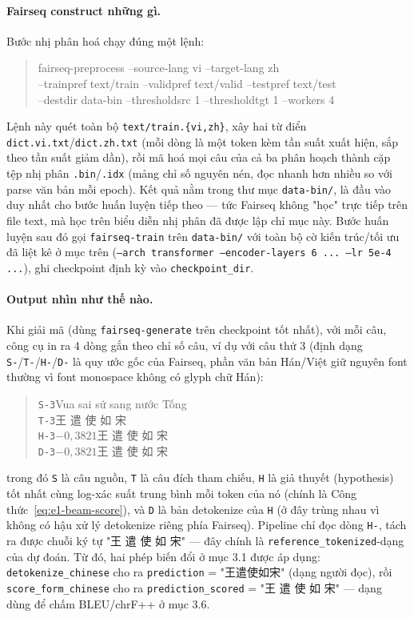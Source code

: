 \paragraph{Fairseq construct những gì.} Bước nhị phân hoá chạy đúng một lệnh:
\begin{quote}\ttfamily\small
fairseq-preprocess --source-lang vi --target-lang zh \\
\quad --trainpref text/train --validpref text/valid --testpref text/test \\
\quad --destdir data-bin --thresholdsrc 1 --thresholdtgt 1 --workers 4
\end{quote}
Lệnh này quét toàn bộ \texttt{text/train.\{vi,zh\}}, xây hai từ điển
\texttt{dict.vi.txt}/\texttt{dict.zh.txt} (mỗi dòng là một token kèm tần suất xuất hiện,
sắp theo tần suất giảm dần), rồi mã hoá mọi câu của cả ba phân hoạch thành cặp tệp nhị
phân \texttt{.bin}/\texttt{.idx} (mảng chỉ số nguyên nén, đọc nhanh hơn nhiều so với parse
văn bản mỗi epoch). Kết quả nằm trong thư mục \texttt{data-bin/}, là đầu vào duy nhất cho
bước huấn luyện tiếp theo — tức Fairseq không "học" trực tiếp trên file text, mà học trên
biểu diễn nhị phân đã được lập chỉ mục này. Bước huấn luyện sau đó gọi
\texttt{fairseq-train} trên \texttt{data-bin/} với toàn bộ cờ kiến trúc/tối ưu đã liệt kê
ở mục trên (\texttt{--arch transformer --encoder-layers 6 ... --lr 5e-4 ...}), ghi
checkpoint định kỳ vào \texttt{checkpoint\_dir}.

\paragraph{Output nhìn như thế nào.} Khi giải mã (dùng \texttt{fairseq-generate} trên
checkpoint tốt nhất), với mỗi câu, công cụ in ra 4 dòng gắn theo chỉ số câu, ví dụ với
câu thứ 3 (định dạng \texttt{S-}/\texttt{T-}/\texttt{H-}/\texttt{D-} là quy ước gốc của
Fairseq, phần văn bản Hán/Việt giữ nguyên font thường vì font monospace không có glyph
chữ Hán):

\begin{quote}\small
\texttt{S-3}\quad Vua sai sứ sang nước Tống \\
\texttt{T-3}\quad 王 遣 使 如 宋 \\
\texttt{H-3}\quad $-0{,}3821$\quad 王 遣 使 如 宋 \\
\texttt{D-3}\quad $-0{,}3821$\quad 王 遣 使 如 宋
\end{quote}
trong đó \texttt{S} là câu nguồn, \texttt{T} là câu đích tham chiếu, \texttt{H} là giả
thuyết (hypothesis) tốt nhất cùng log-xác suất trung bình mỗi token của nó (chính là
Công thức~\ref{eq:e1-beam-score}), và \texttt{D} là bản detokenize của \texttt{H} (ở đây
trùng nhau vì không có hậu xử lý detokenize riêng phía Fairseq). Pipeline chỉ đọc dòng
\texttt{H-}, tách ra được chuỗi ký tự "王 遣 使 如 宋" — đây chính là
\texttt{reference\_tokenized}-dạng của dự đoán. Từ đó, hai phép biến đổi ở mục 3.1 được
áp dụng: \texttt{detokenize\_chinese} cho ra \texttt{prediction} = "王遣使如宋" (dạng
người đọc), rồi \texttt{score\_form\_chinese} cho ra \texttt{prediction\_scored} = "王 遣
使 如 宋" — dạng dùng để chấm BLEU/chrF++ ở mục 3.6.

